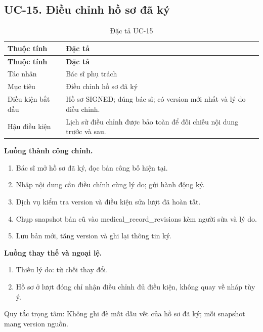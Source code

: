 \clearpage

\subsection{UC-15.\allowbreak{} Điều chỉnh hồ sơ đã ký}
\label{uc:15}

{\small\setlength{\tabcolsep}{3pt}\renewcommand{\arraystretch}{1.12}
\begin{longtable}{@{}L{\textwidth-1.32pt\relax} L{\textwidth-4.68pt\relax}@{}}
\caption{Đặc tả UC-15}\\
\toprule
\textbf{Thuộc tính} & \textbf{Đặc tả}\\\midrule
\endfirsthead
\toprule
\textbf{Thuộc tính} & \textbf{Đặc tả}\\\midrule
\endhead
\bottomrule\endlastfoot
Tác nhân & Bác sĩ phụ trách\\[3pt]
Mục tiêu & Điều chỉnh hồ sơ đã ký\\[3pt]
Điều kiện bắt đầu & Hồ sơ SIGNED; đúng bác sĩ; có version mới nhất và lý do điều chỉnh.\allowbreak{}\\[3pt]
Hậu điều kiện & Lịch sử điều chỉnh được bảo toàn để đối chiếu nội dung trước và sau.\allowbreak{}\\[3pt]
\end{longtable}}
\noindent\textbf{Luồng thành công chính.}
\begin{enumerate}
\item Bác sĩ mở hồ sơ đã ký, đọc bản công bố hiện tại.\allowbreak{}
\item Nhập nội dung cần điều chỉnh cùng lý do; gửi hành động ký.\allowbreak{}
\item Dịch vụ kiểm tra version và điều kiện sửa lượt đã hoàn tất.\allowbreak{}
\item Chụp snapshot bản cũ vào medical\_\allowbreak{}record\_\allowbreak{}revisions kèm người sửa và lý do.\allowbreak{}
\item Lưu bản mới, tăng version và ghi lại thông tin ký.\allowbreak{}
\end{enumerate}
\noindent\textbf{Luồng thay thế và ngoại lệ.}
\begin{enumerate}
\item Thiếu lý do:\allowbreak{} từ chối thay đổi.\allowbreak{}
\item Hồ sơ ở lượt đóng chỉ nhận điều chỉnh đủ điều kiện, không quay về nháp tùy ý.\allowbreak{}
\end{enumerate}
Quy tắc trọng tâm:\allowbreak{} Không ghi đè mất dấu vết của hồ sơ đã ký; mỗi snapshot mang version nguồn.\allowbreak{}


